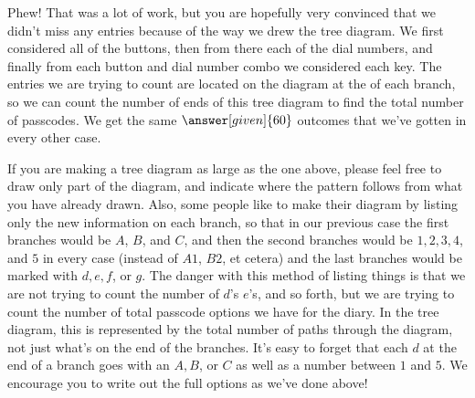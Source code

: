\documentclass{ximera}
\begin{document}
\begin{example}
\begin{image}
\end{image}
Phew! That was a lot of work, but you are hopefully very convinced that we didn't miss any entries because of the way we drew the tree diagram. We first considered all of the buttons, then from there each of the dial numbers, and finally from each button and dial number combo we considered each key. The entries we are trying to count are located on the diagram at the  of each branch, so we can count the number of ends of this tree diagram to find the total number of passcodes.  We get the same $\answer[given]{60}$ outcomes that we've gotten in every other case.

\end{example}
If you are making a tree diagram as large as the one above, please feel free to draw only part of the diagram, and indicate where the pattern follows from what you have already drawn. Also, some people like to make their diagram by listing only the new information on each branch, so that in our previous case the first branches would be $A$, $B$, and $C$, and then the second branches would be $1, 2, 3, 4$, and $5$ in every case (instead of $A1$, $B2$, et cetera) and the last branches would be marked with $d, e, f$, or $g$. The danger with this method of listing things is that we are not trying to count the number of $d$'s $e$'s, and so forth, but we are trying to count the number of total passcode options we have for the diary. In the tree diagram, this is represented by the total number of paths through the diagram, not just what's on the end of the branches. It's easy to forget that each $d$ at the end of a branch goes with an $A, B$, or $C$ as well as a number between $1$ and $5$. We encourage you to write out the full options as we've done above!
\end{document}
